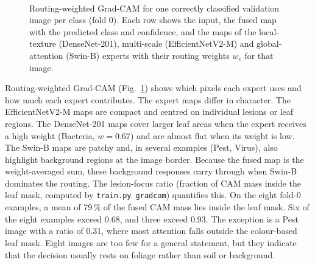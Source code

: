 \begin{figure}[p]
  \centering
  \\[2pt]
  \\[2pt]
  \\[2pt]
  \\[2pt]
  \\[2pt]
  \\[2pt]
  \caption{Routing-weighted Grad-CAM for one correctly classified validation image
  per class (fold 0). Each row shows the input, the fused map with the predicted
  class and confidence, and the maps of the local-texture (DenseNet-201),
  multi-scale (EfficientNetV2-M) and global-attention (Swin-B) experts with their
  routing weights $w_e$ for that image.}
  \label{fig:gradcam}
\end{figure}

Routing-weighted Grad-CAM (Fig.~\ref{fig:gradcam}) shows which pixels each expert
uses and how much each expert contributes. The expert maps differ in character.
The EfficientNetV2-M maps are compact and centred on individual lesions or leaf
regions. The DenseNet-201 maps cover larger leaf areas when the expert receives a
high weight (Bacteria, $w=0.67$) and are almost flat when its weight is low. The
Swin-B maps are patchy and, in several examples (Pest, Virus), also highlight
background regions at the image border. Because the fused map is the
weight-averaged sum, these background responses carry through when Swin-B
dominates the routing. The lesion-focus ratio (fraction of CAM mass inside the leaf mask,
computed by \texttt{train.py gradcam}) quantifies this. On the eight fold-0
examples, a mean of 79\,\% of the fused CAM mass lies inside the leaf mask. Six
of the eight examples exceed 0.68, and three exceed 0.93. The exception is a Pest
image with a ratio of 0.31, where most attention falls outside the colour-based
leaf mask. Eight images are too few for a general statement, but they indicate
that the decision usually rests on foliage rather than soil or background.
